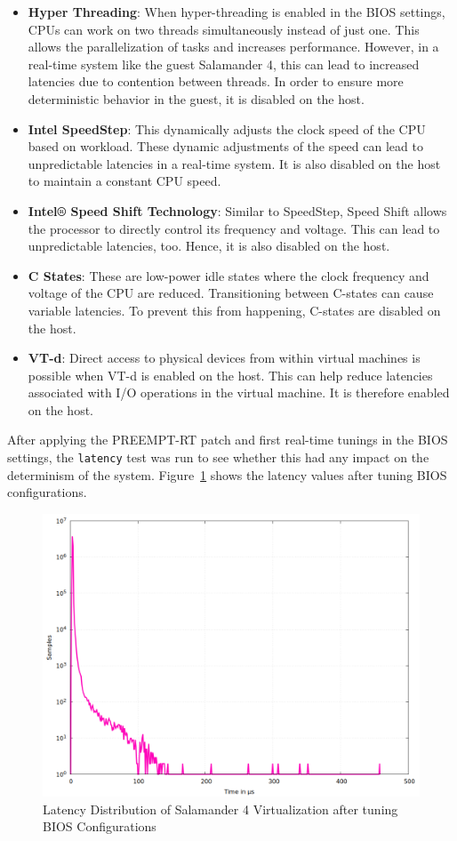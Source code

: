 \documentclass[MMR,Master,english]{style/twbook}
\begin{document}
\begin{itemize}
	\item \textbf{Hyper Threading}: When hyper-threading is enabled in the BIOS settings, CPUs can work on two threads simultaneously instead of just one. This allows the parallelization of tasks and increases performance. However, in a real-time system like the guest Salamander 4, this can lead to increased latencies due to contention between threads. In order to ensure more deterministic behavior in the guest, it is disabled on the host.
	\item \textbf{Intel SpeedStep}: This dynamically adjusts the clock speed of the CPU based on workload. These dynamic adjustments of the speed can lead to unpredictable latencies in a real-time system. It is also disabled on the host to maintain a constant CPU speed.
	\item \textbf{Intel® Speed Shift Technology}: Similar to SpeedStep, Speed Shift allows the processor to directly control its frequency and voltage. This can lead to unpredictable latencies, too. Hence, it is also disabled on the host.
	\item \textbf{C States}: These are low-power idle states where the clock frequency and voltage of the CPU are reduced. Transitioning between C-states can cause variable latencies. To prevent this from happening, C-states are disabled on the host.
	\item \textbf{VT-d}: Direct access to physical devices from within virtual machines is possible when VT-d is enabled on the host. This can help reduce latencies associated with I/O operations in the virtual machine. It is therefore enabled on the host.
\end{itemize}

\noindent After applying the PREEMPT-RT patch and first real-time tunings in the BIOS settings, the \texttt{latency} test was run to see whether this had any impact on the determinism of the system. Figure~\ref{fig:gnuplot_max_latency_taskset} shows the latency values after tuning BIOS configurations.

\begin{figure}[H]
	\centering
	\includegraphics[width=0.7\columnwidth]{img/implementation/gnuplot_max_latency_taskset.png}
	\caption[Latency Distribution of Salamander 4 after BIOS Configurations]{Latency Distribution of Salamander 4 Virtualization after tuning BIOS Configurations}
	\label{fig:gnuplot_max_latency_taskset}
\end{figure}
\end{document}
